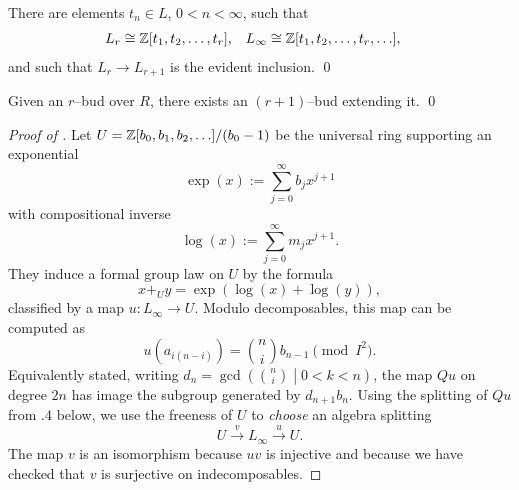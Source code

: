 \begin{corollary}
There are elements $t_n \in L$, $0 < n < \infty$, such that
\begin{align*}
L_r & \cong \mathbb Z[t_1, t_2, \ldots, t_r], &
L_\infty & \cong \mathbb Z[t_1, t_2, \ldots, t_r, \ldots],
\end{align*}
and such that $L_r \to L_{r+1}$ is the evident inclusion. \qed
\end{corollary}

\begin{corollary}
Given an $r$--bud over $R$, there exists an $(r+1)$--bud extending it. \qed
\end{corollary}

\begin{proof}[{Proof of }]
Let $U = \mathbb Z[b_0, b_1, b_2, \ldots] / (b_0 - 1)$ be the universal ring supporting an exponential \[\exp(x) := \sum_{j=0}^\infty b_j x^{j+1}\] with compositional inverse \[\log(x) := \sum_{j=0}^\infty m_j x^{j+1}.\]  They induce a formal group law on $U$ by the formula \[x +_U y = \exp(\log(x) + \log(y)),\] classified by a map $u: L_\infty \to U$.  Modulo decomposables, this map can be computed as \[u(a_{i(n-i)}) = \binom{n}{i} b_{n-1} \pmod{I^2}.\]  Equivalently stated, writing $d_n = \gcd\left( \binom{n}{i} \middle| 0 < k < n \right)$, the map $Qu$ on degree $2n$ has image the subgroup generated by $d_{n+1} b_n$.  Using the splitting of $Qu$ from .4 below, we use the freeness of $U$ to \emph{choose} an algebra splitting \[U \xrightarrow{v} L_\infty \xrightarrow{u} U.\]  The map $v$ is an isomorphism because $uv$ is injective and because we have checked that $v$ is surjective on indecomposables.
\end{proof}


